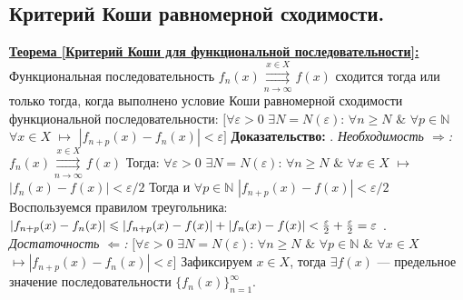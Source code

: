 \documentclass[a4paper,12pt]{article} %
\renewcommand {\geq}{\geqslant}
\renewcommand {\leq}{\leqslant}
\begin{document}
\subsection{Критерий Коши равномерной сходимости.}
\underline{\textbf{Теорема [Критерий Коши для функциональной последовательности]:}} Функциональная последовательность $f_n(x) \overset{x \in X}{\underset{n \rightarrow \infty}{\rightrightarrows}} f(x)$ сходится тогда или только тогда, когда выполнено условие Коши
равномерной сходимости функциональной последовательности: \newline
\hspace*{5mm}$\big[\forall \varepsilon > 0 $  $\exists N = N(\varepsilon)$: $\forall n \geq N$  $\&$ $\forall p \in  \mathds{N}$ $\forall x \in X$ $\longmapsto$  $|f_{n+p}(x) -f_n(x)| < \varepsilon\big]$
\noindent \textbf{Доказательство:} . \textit{Необходимость $\Rightarrow$:} \newline
\noindent $f_n(x) \overset{x \in X}{\underset{n \rightarrow \infty}{\rightrightarrows}} f(x)$ 
\newline \newline
Тогда: \newline
\hspace*{5mm}$\forall \varepsilon > 0$ $\exists N = N(\varepsilon)$:
$\forall n \geq N$ $\&$ $\forall x \in X$ $\longmapsto$ $|f_n(x) - f(x)| < \varepsilon / 2$ \newline
Тогда и 
\newline 
\hspace*{5mm}$\forall p \in \mathds{N}$ $|f_{n+p}(x) - f(x)| < \varepsilon / 2$
\newline \newline 
Воспользуемся правилом треугольника: \newline \newline
$|f_{n+p}(x) - f_n(x)| \leq |f_{n+p}(x) - f(x)| + |f_n(x) - f(x)| < {\varepsilon \over 2} + {\varepsilon \over 2} = \varepsilon$
\noindent  \newline {}. \textit{Достаточность $\Leftarrow$:} \newline
\hspace*{5mm}$\big[\forall \varepsilon > 0 $  $\exists N = N(\varepsilon)$: $\forall n \geq N$  $\&$ $\forall p \in  \mathds{N}$ $\&$ $\forall x \in X$ $\longmapsto |f_{n+p}(x) -f_n(x)| < \varepsilon\big]$
\newline \newline 
Зафиксируем $x \in X$, тогда $\exists f(x)$ --- предельное значение последовательности $\{f_n(x)\}_{n=1}^\infty$. \newline \newline 
\end{document}
